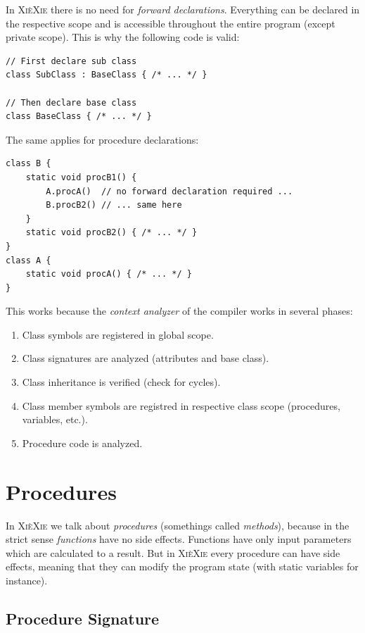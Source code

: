 \documentclass{report}
\def\xiexie{\textsc{Xi\`eXie}\xspace}
\begin{document}
In \xiexie there is no need for \textit{forward declarations}. Everything can be declared in the respective scope
and is accessible throughout the entire program (except private scope). This is why the following code is valid:
\begin{lstlisting}
// First declare sub class
class SubClass : BaseClass { /* ... */ }

// Then declare base class
class BaseClass { /* ... */ }
\end{lstlisting}
The same applies for procedure declarations:
\begin{lstlisting}
class B {
    static void procB1() {
        A.procA()  // no forward declaration required ...
        B.procB2() // ... same here
    }
    static void procB2() { /* ... */ }
}
class A {
    static void procA() { /* ... */ }
}
\end{lstlisting}
This works because the \textit{context analyzer} of the compiler works in several phases:
\begin{enumerate}
	\item Class symbols are registered in global scope.
	\item Class signatures are analyzed (attributes and base class).
	\item Class inheritance is verified (check for cycles).
	\item Class member symbols are registred in respective class scope (procedures, variables, etc.).
	\item Procedure code is analyzed.
\end{enumerate}



\section{Procedures}

In \xiexie we talk about \textit{procedures} (somethings called \textit{methods}),
because in the strict sense \textit{functions} have no side effects.
Functions have only input parameters which are calculated to a result. But in \xiexie every procedure can have side effects,
meaning that they can modify the program state (with static variables for instance).

\subsection{Procedure Signature}
\end{document}
